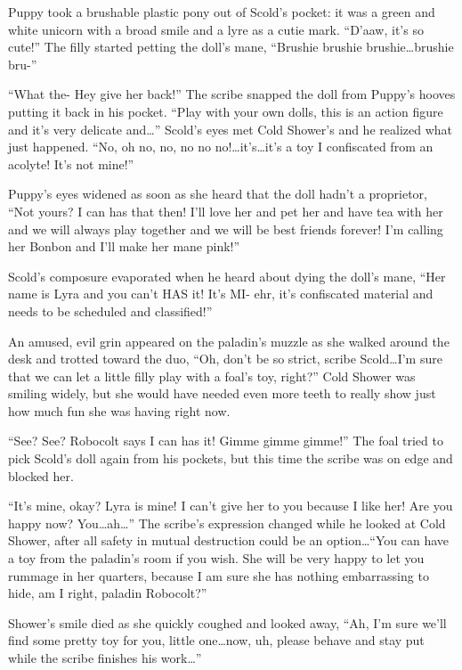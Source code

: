 Puppy took a brushable plastic pony out of Scold's pocket: it was a green and white unicorn with a broad smile and a lyre as a cutie mark. ``D'aaw, it's so cute!'' The filly started petting the doll's mane, ``Brushie brushie brushie\dots brushie bru-''

``What the- Hey give her back!'' The scribe snapped the doll from Puppy's hooves putting it back in his pocket. ``Play with your own dolls, this is an action figure and it's very delicate and\dots'' Scold's eyes met Cold Shower's and he realized what just happened. ``No, oh no, no, no no no!\dots it's\dots it's a toy I confiscated from an acolyte! It's not mine!''

Puppy's eyes widened as soon as she heard that the doll hadn't a proprietor, ``Not yours? I can has that then! I'll love her and pet her and have tea with her and we will always play together and we will be best friends forever! I'm calling her Bonbon and I'll make her mane pink!''

Scold's composure evaporated when he heard about dying the doll's mane, ``Her name is Lyra and you can't HAS it! It's MI- ehr, it's confiscated material and needs to be scheduled and classified!''

An amused, evil grin appeared on the paladin's muzzle as she walked around the desk and trotted toward the duo, ``Oh, don't be so strict, scribe Scold\dots I'm sure that we can let a little filly play with a foal's toy, right?'' Cold Shower was smiling widely, but she would have needed even more teeth to really show just how much fun she was having right now.

``See? See? Robocolt says I can has it! Gimme gimme gimme!'' The foal tried to pick Scold's doll again from his pockets, but this time the scribe was on edge and blocked her.

``It's mine, okay? Lyra is mine! I can't give her to you because I like her! Are you happy now? You\dots ah\dots'' The scribe's expression changed while he looked at Cold Shower, after all safety in mutual destruction could be an option\dots ``You can have a toy from the paladin's room if you wish. She will be very happy to let you rummage in her quarters, because I am sure she has nothing embarrassing to hide, am I right, paladin Robocolt?''

Shower's smile died as she quickly coughed and looked away, ``Ah, I'm sure we'll find some pretty toy for you, little one\dots now, uh, please behave and stay put while the scribe finishes his work\dots''


